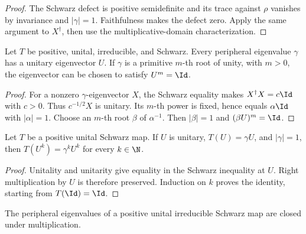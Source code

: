 \begin{proof}\leanok
    The Schwarz defect is positive semidefinite and its trace against
    $\rho$ vanishes by invariance and $|\gamma|=1$. Faithfulness makes the
    defect zero. Apply the same argument to $X^\dagger$, then use the
    multiplicative-domain characterization.
\end{proof}

\begin{theorem}
    \label{thm:schwarz_peripheral_unitary}
    \leanok
    Let $T$ be positive, unital, irreducible, and Schwarz. Every peripheral
    eigenvalue $\gamma$ has a unitary eigenvector $U$. If $\gamma$ is a
    primitive $m$-th root of unity, with $m>0$, the eigenvector can be chosen
    to satisfy $U^m=\Id$.
\end{theorem}

\begin{proof}\leanok
    For a nonzero $\gamma$-eigenvector $X$, the Schwarz equality makes
    $X^\dagger X=c\Id$ with $c>0$. Thus $c^{-1/2}X$ is unitary. Its $m$-th
    power is fixed, hence equals $\alpha\Id$ with $|\alpha|=1$. Choose an
    $m$-th root $\beta$ of $\alpha^{-1}$. Then $|\beta|=1$ and
    $(\beta U)^m=\Id$.
\end{proof}

\begin{theorem}
    \label{thm:schwarz_unitary_powers}
    \leanok
    Let $T$ be a positive unital Schwarz map. If $U$ is unitary,
    $T(U)=\gamma U$, and $|\gamma|=1$, then
    $T(U^k)=\gamma^kU^k$ for every $k\in\N$.
\end{theorem}

\begin{proof}\leanok
    Unitality and unitarity give equality in the Schwarz inequality at $U$.
    Right multiplication by $U$ is therefore preserved. Induction on $k$
    proves the identity, starting from $T(\Id)=\Id$.
\end{proof}

\begin{theorem}
    \label{thm:schwarz_peripheral_products}
    \leanok
    The peripheral eigenvalues of a positive unital irreducible Schwarz map
    are closed under multiplication.
\end{theorem}

